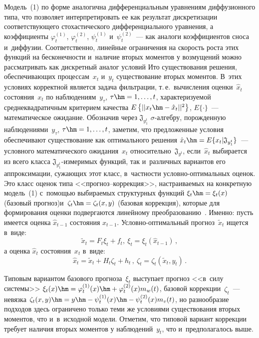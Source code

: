 \begin{multicols}{2}
    Модель~(1) по форме аналогична диффе\-рен\-циальным уравнениям 
диффузионного типа, что позволяет интерпретировать ее как результат 
дискретизации соответствующего стохастического дифференциального 
уравнения, а коэффициенты $\varphi_t^{(1)}$, $\varphi_t^{(2)}$, $\psi_t^{(1)}$ 
и~$\psi_t^{(2)}$~--- как аналоги коэффициентов сноса и~диффузии. 
Соответственно, линейные ограничения на скорость роста этих функций на 
бесконечности и~наличие вторых моментов у возмущений можно 
рассматривать как дискретный аналог условий Ито существования решения, 
обеспечивающих процессам~$x_t$ и~$y_t$ существование вторых моментов. 
В~этих условиях корректной является задача фильтрации, т.\,е.\ вычисления 
оценки~$\hat{x}_t$ состояния~$x_t$ по наблюдениям~$y_\tau$, 
$\tau\hm=1,\ldots , t$, характеризуемой среднеквадратичным критерием качества 
$E\left\{ \vert\vert x_t\hm- \hat{x}_t\vert\vert^2\right\}$, $E\{\cdot\}$~--- 
математическое ожидание.  Обозначив через $\mathfrak{J}_{y_1^{t}}$ 
$\sigma$-ал\-геб\-ру, порожденную наблюдениями~$y_\tau$, $\tau\hm=1,\ldots 
,t$, заметим, что предложенные условия обеспечивают существование как 
оптимального решения $\hat{x}_t\hm= E\{ x_t\vert \mathfrak{J}_{y_1^t}\}$~--- 
условного математического ожидания~$x_t$ 
относительно~$\mathfrak{J}_{y^t}$, если~$\hat{x}_t$ выбирается из всего 
класса $\mathfrak{J}_{y_1^t}$-из\-ме\-ри\-мых функций, так и~различных 
вариантов его аппроксимации, сужающих этот класс, в~частности  
услов\-но-оп\-ти\-маль\-ных оценок. Это класс оценок типа\linebreak 
 <<про\-гноз--кор\-рек\-ция>>, настраиваемых на конкретную модель~(1) 
с~помощью выбираемых структурных функций $\xi_t\hm=\xi_t(x)$ (базовый 
прогноз)\linebreak и~$\zeta_t\hm=\zeta_t(x,y)$ (базовая коррекция), которые для 
формирования оценки подвергаются линейному  
преобразованию~\cite{3-bos, 4-bos}. Именно: пусть имеется оценка 
 $\hat{x}_{t-1}$ состояния $x_{t-1}$. Услов\-но-оп\-ти\-маль\-ный 
прогноз~$\tilde{x}_t$ ищется в~виде:
    \begin{equation}
    \tilde{x}_t=F_t\xi_t+f_t,\ \xi_t=\xi_t\left( \hat{x}_{t-1}\right)\,,
    \label{e2-bos}
    \end{equation}
    а оценка $\hat{x}_t$ состояния~$x_t$ в~виде:
    \begin{equation}
    \hat{x}_t=\tilde{x}_t+H_t\zeta_t +h_t\,,\ \zeta_t=\zeta_t\left( \tilde{x}_t, 
y_t\right)\,.
    \label{e3-bos}
\end{equation}
    
    Типовым вариантом базового прогноза~$\xi_t$ выступает прогноз 
<<в~силу системы>> $\xi_t(x)\hm= \varphi_t^{(1)}(x)\hm+ \varphi_t^{(2)}(x) 
m_w(t)$, базовой коррекции~$\zeta_t$~--- невязка $\zeta_t(x,y)\hm= y\hm- 
\psi_t^{(1)}(x)\hm- \psi_t^{(2)}(x) m_v(t)$, но разнообразие подходов здесь 
ограничено только теми же условиями существования вторых моментов, что 
и~в~исходной модели. Отметим, что типовой вариант коррекции требует 
наличия вторых моментов у наблюдений~$y_t$, что и~предполагалось выше.
    

\end{multicols}
